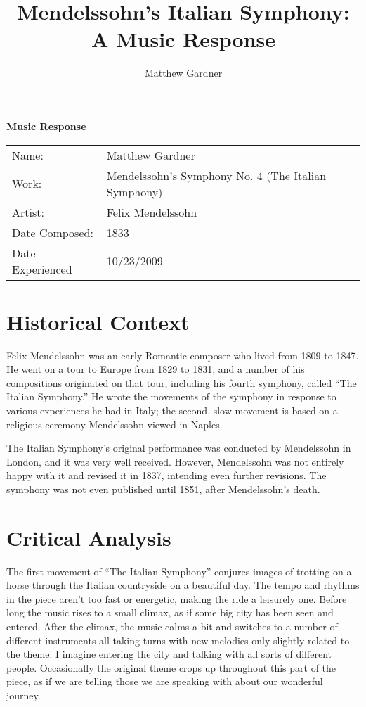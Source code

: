 \documentclass[onecolumn, 12pt]{article}
\title{Mendelssohn's Italian Symphony: A Music Response}
\author{Matthew Gardner}
\date{}
\begin{document}
\textbf{Music Response}

\begin{tabular}{ll}
  Name:&Matthew Gardner \\
  Work:&Mendelssohn's Symphony No. 4 (The Italian Symphony) \\
  Artist:&Felix Mendelssohn \\
  Date Composed:&1833 \\
  Date Experienced&10/23/2009 \\
\end{tabular}


\section*{Historical Context}

Felix Mendelssohn was an early Romantic composer who lived from 1809 to 1847.
He went on a tour to Europe from 1829 to 1831, and a number of his compositions
originated on that tour, including his fourth symphony, called ``The Italian
Symphony.''  He wrote the movements of the symphony in response to various
experiences he had in Italy; the second, slow movement is based on a religious
ceremony Mendelssohn viewed in Naples.

The Italian Symphony's original performance was conducted by Mendelssohn in
London, and it was very well received.  However, Mendelssohn was not entirely
happy with it and revised it in 1837, intending even further revisions.  The
symphony was not even published until 1851, after Mendelssohn's death.

\section*{Critical Analysis}

The first movement of ``The Italian Symphony'' conjures images of trotting on a
horse through the Italian countryside on a beautiful day.  The tempo and
rhythms in the piece aren't too fast or energetic, making the ride a leisurely
one.  Before long the music rises to a small climax, as if some big city has
been seen and entered.  After the climax, the music calms a bit and switches to
a number of different instruments all taking turns with new melodies only
slightly related to the theme.  I imagine entering the city and talking with
all sorts of different people.  Occasionally the original theme crops up
throughout this part of the piece, as if we are telling those we are speaking
with about our wonderful journey.
\end{document}
